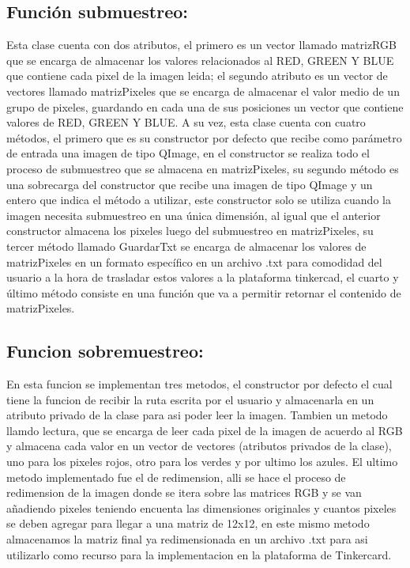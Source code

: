 \documentclass{article}
\begin{document}
\subsection{Función submuestreo: }
Esta clase cuenta con dos atributos, el primero es un vector llamado matrizRGB que se encarga de almacenar los valores relacionados al RED, GREEN Y BLUE  que contiene cada pixel de la imagen leida; el segundo atributo es un vector de vectores llamado matrizPixeles que se encarga de almacenar el valor medio de un grupo de pixeles, guardando en cada una de sus posiciones un vector que contiene valores de RED, GREEN Y BLUE. A su vez, esta clase cuenta con cuatro métodos, el primero que es su constructor por defecto que recibe como parámetro de entrada una imagen de tipo QImage, en el constructor se realiza todo el proceso de submuestreo que se almacena en matrizPixeles, su segundo método es una sobrecarga del constructor que recibe una imagen de tipo QImage y un entero que indica el método a utilizar, este constructor solo se utiliza cuando la imagen necesita submuestreo en una única dimensión, al igual que el anterior constructor almacena los pixeles luego del submuestreo en matrizPixeles, su tercer método llamado GuardarTxt se encarga de almacenar los valores de matrizPixeles en un formato específico en un archivo .txt para comodidad del usuario a la hora de trasladar estos valores a la plataforma tinkercad, el cuarto y último método consiste en una función que va a permitir retornar el contenido de matrizPixeles.

\subsection{Funcion sobremuestreo:}
En esta funcion se implementan tres metodos, el constructor por defecto el cual tiene la funcion de recibir la ruta escrita por el usuario y almacenarla en un atributo privado de la clase para asi poder leer la imagen. Tambien un metodo llamdo lectura, que se encarga de leer cada pixel de la imagen de acuerdo al RGB y almacena cada valor en un vector de vectores (atributos privados de la clase), uno para los pixeles rojos, otro para los verdes y por ultimo los azules. El ultimo metodo implementado fue el de redimension, alli se hace el proceso de redimension de la imagen donde se itera sobre las matrices RGB y se van añadiendo pixeles teniendo encuenta las dimensiones originales y cuantos pixeles se deben agregar para llegar a una matriz de 12x12, en este mismo metodo almacenamos la matriz final ya redimensionada en un archivo .txt para asi utilizarlo como recurso para la implementacion en la plataforma de Tinkercard.
\end{document}
